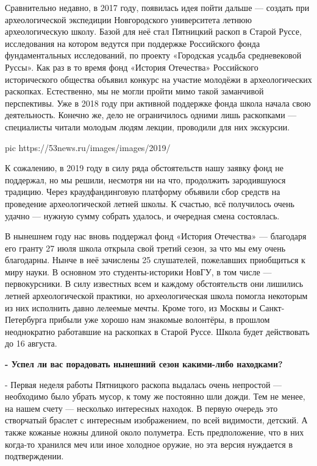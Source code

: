 Сравнительно недавно, в 2017 году, появилась идея пойти дальше — создать при
археологической экспедиции Новгородского университета летнюю археологическую
школу. Базой для неё стал Пятницкий раскоп в Старой Руссе, исследования на
котором ведутся при поддержке Российского фонда фундаментальных исследований,
по проекту «Городская усадьба средневековой Руссы». Как раз в то время фонд
«История Отечества» Российского исторического общества объявил конкурс на
участие молодёжи в археологических раскопках. Естественно, мы не могли пройти
мимо такой заманчивой перспективы. Уже в 2018 году при активной поддержке фонда
школа начала свою деятельность. Конечно же, дело не ограничилось одними лишь
раскопками — специалисты читали молодым людям лекции, проводили для них
экскурсии.

\ifcmt
pic https://53news.ru/images/images/2019/%
\fi

К сожалению, в 2019 году в силу ряда обстоятельств нашу заявку фонд не
поддержал, но мы решили, несмотря ни на что, продолжить зародившуюся традицию.
Через краудфандинговую платформу объявили сбор средств на проведение
археологической летней школы. К счастью, всё получилось очень удачно — нужную
сумму собрать удалось, и очередная смена состоялась.

В нынешнем году нас вновь поддержал фонд «История Отечества» — благодаря его
гранту 27 июля школа открыла свой третий сезон, за что мы ему очень благодарны.
Нынче в неё зачислены 25 слушателей, пожелавших приобщиться к миру науки. В
основном это студенты-историки НовГУ, в том числе — первокурсники. В силу
известных всем и каждому обстоятельств они лишились летней археологической
практики, но археологическая школа помогла некоторым из них исполнить давно
лелеемые мечты. Кроме того, из Москвы и Санкт-Петербурга прибыли уже хорошо нам
знакомые волонтёры, в прошлом неоднократно работавшие на раскопках в Старой
Руссе. Школа будет действовать до 16 августа.

\textbf{- Успел ли вас порадовать нынешний сезон какими-либо находками?}

- Первая неделя работы Пятницкого раскопа выдалась очень непростой — необходимо
было убрать мусор, к тому же постоянно шли дожди. Тем не менее, на нашем счету
— несколько интересных находок. В первую очередь это створчатый браслет с
интересным изображением, по всей видимости, детский. А также кожаные ножны
длиной около полуметра. Есть предположение, что в них когда-то хранился меч или
иное холодное оружие, но эта версия нуждается в подтверждении.

